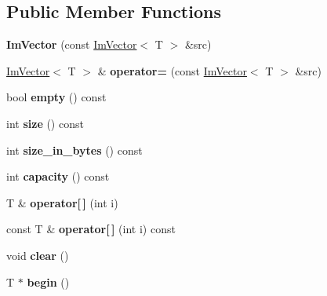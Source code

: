 \subsection*{Public Member Functions}
\begin{DoxyCompactItemize}
\item 
\mbox{\label{structImVector_a6e2ee59d8b2fa1583617a2110a56aed4}} 
{\bfseries Im\+Vector} (const \hyperlink{structImVector}{Im\+Vector}$<$ T $>$ \&src)
\item 
\mbox{\label{structImVector_a0d795963a9fd9d15833fdf87ba292438}} 
\hyperlink{structImVector}{Im\+Vector}$<$ T $>$ \& {\bfseries operator=} (const \hyperlink{structImVector}{Im\+Vector}$<$ T $>$ \&src)
\item 
\mbox{\label{structImVector_aa53e48a5272f4bad1099368769514ff1}} 
bool {\bfseries empty} () const
\item 
\mbox{\label{structImVector_a8c903ecb1aaee0601b6a8ad835a4a435}} 
int {\bfseries size} () const
\item 
\mbox{\label{structImVector_ade9f2e937e47b0e0f9970dcfba038204}} 
int {\bfseries size\+\_\+in\+\_\+bytes} () const
\item 
\mbox{\label{structImVector_ac17681baa8b9b5cd97e556da29f9ef73}} 
int {\bfseries capacity} () const
\item 
\mbox{\label{structImVector_afb61bbfb1be8f3db4586854de04173e1}} 
T \& {\bfseries operator\mbox{[}$\,$\mbox{]}} (int i)
\item 
\mbox{\label{structImVector_af7585c60921f739085229bb8cd78191c}} 
const T \& {\bfseries operator\mbox{[}$\,$\mbox{]}} (int i) const
\item 
\mbox{\label{structImVector_ae2d401b4ec5f1113cdb8edb5a61a38f7}} 
void {\bfseries clear} ()
\item 
\mbox{\label{structImVector_a470909b2720bc5cb71ec023439e9c814}} 
T $\ast$ {\bfseries begin} ()
\item 
\mbox{\label{structImVector_a05442a30c96197c24d17e736cd2a68b2}} 

\end{DoxyCompactItemize}
